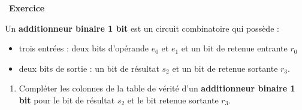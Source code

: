 \documentclass[
  11pt,
]{article}
\providecommand{\tightlist}{%
  \setlength{\itemsep}{0pt}\setlength{\parskip}{0pt}}
\newcounter{exo}
\newenvironment{exercice}[1]
{\par \medskip   \addtocounter{exo}{1} \noindent  
\begin{bclogo}[arrondi =0.1,   noborder = true, logo=\bccrayon, marge=4]{~\textbf{Exercice} \textbf{\theexo} {\itshape #1} }  \par}
{
\end{bclogo}
 \par \bigskip }
\newcounter{def}
\begin{document}
\begin{exercice}{}

Un \textbf{additionneur binaire 1 bit} est un circuit combinatoire qui
possède :

\begin{itemize}
\tightlist
\item
  trois entrées : deux bits d'opérande \(e_{0}\) et \(e_{1}\) et un bit
  de retenue entrante \(r_{0}\)
\item
  deux bits de sortie : un bit de résultat \(s_{2}\) et un bit de
  retenue sortante \(r_{3}\).
\end{itemize}

\begin{enumerate}
\def\labelenumi{\arabic{enumi}.}
\tightlist
\item
  Compléter les colonnes de la table de vérité d'un \textbf{additionneur
  binaire 1 bit} pour le bit de résultat \(s_{2}\) et le bit retenue
  sortante \(r_{3}\).
\end{enumerate}


\end{exercice}
\end{document}
